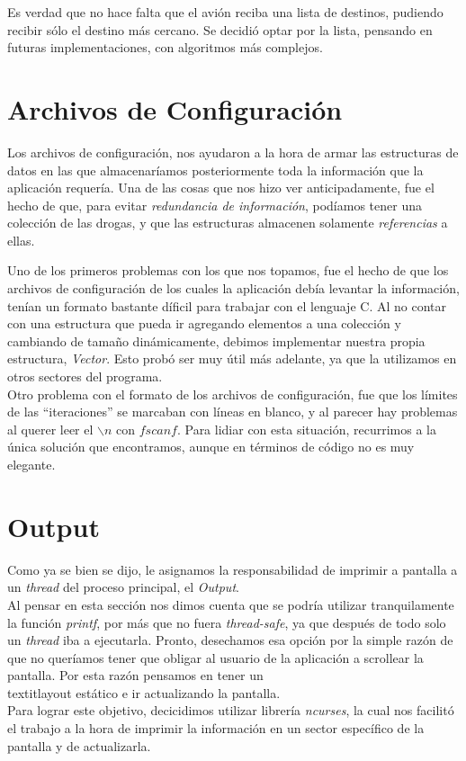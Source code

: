 \documentclass[a4paper,10pt]{article}
\begin{document}
Es verdad que no hace falta que el avión reciba una lista de destinos, pudiendo recibir sólo el destino más cercano. Se decidió optar por la lista, pensando en futuras
implementaciones, con algoritmos más complejos.

\newpage
\section{Archivos de Configuración}

Los archivos de configuración, nos ayudaron a la hora de armar las estructuras de datos en las que almacenaríamos posteriormente toda la información que la 
aplicación requería. Una de las cosas que nos hizo ver anticipadamente, fue el hecho de que, para evitar \textit{redundancia de información}, podíamos tener 
una colección de las drogas, y que las estructuras almacenen solamente \textit{referencias} a ellas. 

Uno de los primeros problemas con los que nos topamos, fue el hecho de que los archivos de configuración de los cuales la aplicación debía levantar la información,
 tenían un formato bastante díficil para trabajar con el lenguaje C. Al no contar con una estructura que pueda ir agregando elementos a una colección y cambiando 
de tamaño dinámicamente, debimos implementar nuestra propia estructura, \textit{Vector}. Esto probó ser muy útil más adelante, ya que la utilizamos en otros sectores 
del programa.\\

Otro problema con el formato de los archivos de configuración, fue que los límites de las ``iteraciones'' se marcaban con líneas en blanco, y al parecer hay 
problemas al querer leer el $\backslash n$ con $fscanf$. Para lidiar con esta situación, recurrimos a la única solución que encontramos, aunque en términos de 
código no es muy elegante.\\

\newpage
\section{Output}

Como ya se bien se dijo, le asignamos la responsabilidad de imprimir a pantalla a un \textit{thread} del proceso principal, el \textit{Output}. \\

Al pensar en esta sección nos dimos cuenta que se podría utilizar tranquilamente la función \textit{printf}, por más que no fuera \textit{thread-safe},
 ya que después de todo solo un \textit{thread} iba a ejecutarla. Pronto, desechamos esa opción por la simple razón de que no queríamos tener que obligar al usuario 
de la aplicación a scrollear la pantalla. Por esta razón pensamos en tener un \\textit{layout} estático e ir actualizando la pantalla.\\
Para lograr este objetivo, decicidimos utilizar librería \textit{ncurses}, la cual nos facilitó el trabajo a la hora de imprimir la información en un sector específico
de la pantalla y de actualizarla.\\
\end{document}
